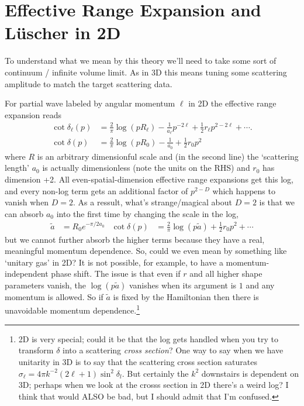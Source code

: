 \section{Effective Range Expansion and L\"{u}scher in 2D}

To understand what we mean by this theory we'll need to take some sort of continuum / infinite volume limit.
As in 3D this means tuning some scattering amplitude to match the target scattering data.

For partial wave labeled by angular momentum $\ell$ in 2D the effective range expansion reads
\begin{align}
	\cot \delta_\ell(p)
	&=
			\frac{2}{\pi} \log(p R_\ell)
		-	\frac{1}{a_\ell} p^{-2\ell}
		+	\frac{1}{2} r_\ell p^{2-2\ell}
		+	\cdots.
	\\
	\cot \delta(p)
	&=
			\frac{2}{\pi} \log(p R_0)
		-	\frac{1}{a_0}
		+	\frac{1}{2} r_0 p^2
\end{align}
where $R$ is an arbitrary dimensionful scale and (in the second line) the `scattering length' $a_0$ is actually dimensionless (note the units on the RHS) and $r_0$ has dimension +2.
All even-spatial-dimension effective range expansions get this log, and every non-log term gets an additional factor of $p^{2-D}$ which happens to vanish when $D=2$.
As a ressult, what's strange/magical about $D=2$ is that we can absorb $a_0$ into the first time by changing the scale in the log,
\begin{align}
	\tilde{a} &= R_0 e^{-\pi/2a_0}
	&
	\cot \delta(p)
	&=
			\frac{2}{\pi} \log(p \tilde{a})
		+	\frac{1}{2} r_0 p^2
		+	\cdots
		\label{eq:ere}
\end{align}
but we cannot further absorb the higher terms because they have a real, meaningful momentum dependence.
So, could we even mean by something like `unitary gas' in 2D?
It is not possible, for example, to have a momentum-independent phase shift.
The issue is that even if $r$ and all higher shape parameters vanish, the $\log(p\tilde{a})$ vanishes when its argument is $1$ and any momentum is allowed.
So if $\tilde{a}$ is fixed by the Hamiltonian then there is unavoidable momentum dependence.\footnote{
	2D is very special; could it be that the log gets handled when you try to transform $\delta$ into a scattering \emph{cross section}?
	One way to say when we have unitarity in 3D is to say that the scattering cross section saturates $\sigma_\ell = 4\pi k^{-2} (2\ell+1) \sin^2 \delta_l$.
	But certainly the $k^2$ downstairs is dependent on 3D; perhaps when we look at the crosss section in 2D there's a weird log?
	I think that would ALSO be bad, but I should admit that I'm confused.
	}

